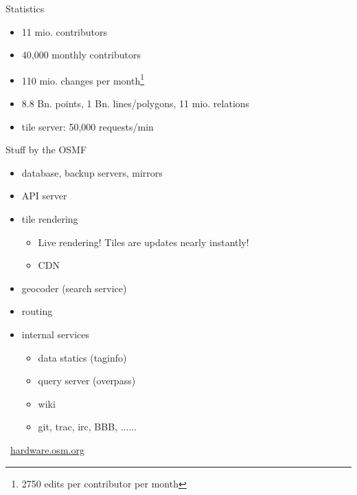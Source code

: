 \documentclass{beamer}
\begin{document}
			\begin{frame}{Statistics}
				\begin{itemize}
					\item 11 mio. contributors
					\item 40,000 monthly contributors
					\item 110 mio. changes per month\footnote{2750 edits per contributor per month}
					\item 8.8 Bn. points, 1 Bn. lines/polygons, 11 mio. relations
					\item tile server: 50,000 requests/min
				\end{itemize}
			\end{frame}
			
			\begin{frame}{Stuff by the OSMF}
				\begin{itemize}
					\item database, backup servers, mirrors
					\item API server
					\item tile rendering
					\begin{itemize}
						\item Live rendering! Tiles are updates nearly instantly!
						\item CDN
					\end{itemize}
					\item geocoder (search service)
					\item routing
					\item internal services
					\begin{itemize}
						\item data statics (taginfo)
						\item query server (overpass)
						\item wiki
						\item git, trac, irc, BBB, ......
					\end{itemize}
				\end{itemize}
				\pause
				\textrightarrow\ \href{https://hardware.openstreetmap.org/}{hardware.osm.org}
			\end{frame}
			
\end{document}
